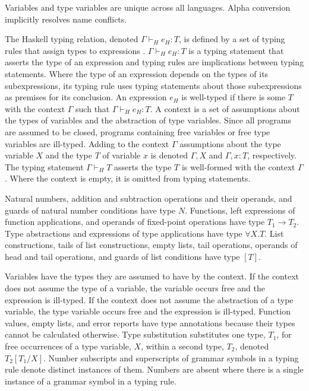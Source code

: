 Variables and type variables are unique across all languages.  Alpha conversion implicitly resolves name conflicts.

The Haskell typing relation, denoted $\Gamma\vdash_{H}e_{H}:T$, is defined by a set of typing rules that assign types to expressions \cite{pierce02}.  $\Gamma\vdash_{H}e_{H}:T$ is a typing statement that asserts the type of an expression and typing rules are implications between typing statements.  Where the type of an expression depends on the types of its subexpressions, its typing rule uses typing statements about those subexpressions as premises for its conclusion.  An expression $e_{H}$ is well-typed if there is some $T$ with the context $\Gamma$ such that $\Gamma\vdash_{H}e_{H}:T$.  A context is a set of assumptions about the types of variables and the abstraction of type variables.  Since all programs are assumed to be closed, programs containing free variables or free type variables are ill-typed.  Adding to the context $\Gamma$ assumptions about the type variable $X$ and the type $T$ of variable $x$ is denoted $\Gamma,X$ and $\Gamma,x:T$, respectively.  The typing statement $\Gamma\vdash_{H}T$ asserts the type $T$ is well-formed with the context $\Gamma$.  Where the context is empty, it is omitted from typing statements.

Natural numbers, addition and subtraction operations and their operands, and guards of natural number conditions have type $N$.  Functions, left expressions of function applications, and operands of fixed-point operations have type $T_{1}\rightarrow T_{2}$.  Type abstractions and expressions of type applications have type $\forall X.T$.  List constructions, tails of list constructions, empty lists, tail operations, operands of head and tail operations, and guards of list conditions have type $[T]$.

Variables have the types they are assumed to have by the context.  If the context does not assume the type of a variable, the variable occurs free and the expression is ill-typed.  If the context does not assume the abstraction of a type variable, the type variable occurs free and the expression is ill-typed.  Function values, empty lists, and error reports have type annotations because their types cannot be calculated otherwise.  Type substitution substitutes one type, $T_{1}$, for free occurrences of a type variable, $X$, within a second type, $T_{2}$, denoted $T_{2}[T_{1}/X]$.  Number subscripts and superscripts of grammar symbols in a typing rule denote distinct instances of them.  Numbers are absent where there is a single instance of a grammar symbol in a typing rule.

